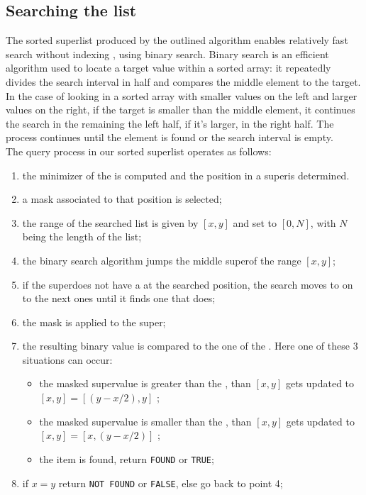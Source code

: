 \subsection{Searching the list}
The sorted super\kmer list produced by the outlined algorithm enables relatively fast search without indexing \kmers, using binary search. Binary search is an efficient algorithm used to locate a target value within a sorted array: it repeatedly divides the search interval in half and compares the middle element to the target.\\
In the case of looking in a sorted array with smaller values on the left and larger values on the right, if the target is smaller than the middle element, it continues the search in the remaining the left half, if it's larger, in the right half. The process continues until the element is found or the search interval is empty.\\
The \kmer query process in our sorted super\kmer list operates as follows:
\begin{enumerate}
	\item the minimizer of the \kmers is computed and the \kmer position in a super\kmer is determined.
	\item a mask associated to that position is selected;
	\item the range of the searched list is given by $[x,y]$ and set to $[0,N]$, with $N$ being the length of the list;
	\item the binary search algorithm jumps the middle super\kmer of the range $[x,y]$;
	\item if the super\kmer does not have a \kmer at the searched position, the search moves to on to the next ones until it finds one that does;
	\item the mask is applied to the super\kmer;
	\item the resulting binary value is compared to the one of the \kmer. Here one of these 3 situations can occur:
	\begin{itemize}
		\item the masked super\kmer value is greater than the \kmer, than $[x,y]$ gets updated to $[x,y] = [(y-x/2),y]$ ;
		\item the masked super\kmer value is smaller than the \kmer, than $[x,y]$ gets updated to $[x,y] = [x,(y-x/2)]$ ;
		\item the item is found, return \texttt{FOUND} or \texttt{TRUE};
	\end{itemize}
	\item if $x = y$ return \texttt{NOT FOUND} or \texttt{FALSE}, else go back to point 4;
\end{enumerate}
